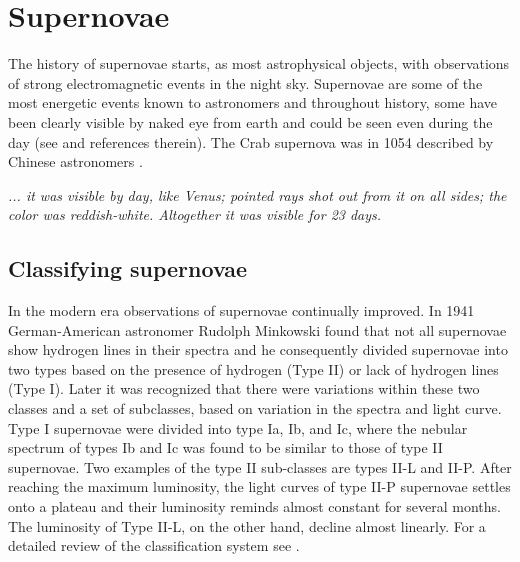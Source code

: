 

\chapter{Supernovae}
The history of supernovae starts, as most astrophysical objects, with observations of strong
electromagnetic events in the night sky. Supernovae are some of the most energetic events known to astronomers and throughout history, some have been clearly visible by naked eye from earth and could be seen even during the day (see \cite{hamacher_14} and references therein). 
The Crab supernova was in 1054 described by Chinese astronomers \citep{ho_96,shen_96}. 
\begin{displayquote}
\textit{... it was visible by day, like Venus; pointed rays shot out
from it on all sides; the color was reddish-white. Altogether it
was visible for 23 days.}
\end{displayquote}
\section{Classifying supernovae}
In the modern era observations of supernovae continually improved. In 1941
German-American astronomer Rudolph Minkowski \citep{minkowski_41} found
that not all supernovae show hydrogen lines in their spectra and
he consequently divided supernovae into two types based on the
presence of hydrogen (Type II) or lack of hydrogen lines (Type I).
Later it was recognized that there were variations within these two classes
and a set of subclasses, based on variation in the spectra and light curve. 
Type I supernovae were divided into type Ia, Ib, and Ic,
where the nebular spectrum of types Ib and Ic was found to be similar to
those of type II supernovae. Two examples of the type II sub-classes are
types II-L and II-P. After reaching the maximum luminosity, the light curves of type II-P supernovae settles onto a
plateau and their luminosity reminds almost constant for several months. The luminosity of Type II-L, on the other hand, 
decline almost linearly. For a detailed review of the classification system see \cite{cappellaro_01}.

